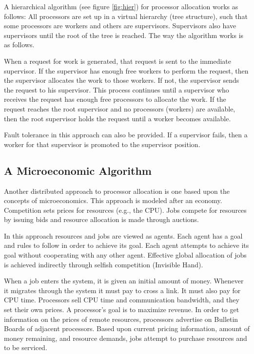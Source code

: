 \documentclass{report}
\begin{document}
A hierarchical algorithm (see figure \ref{fig:hier}) for processor
allocation works as follows: All processors are set up in a virtual
hierarchy (tree structure), such that some processors are workers and others
are supervisors.  Supervisors also have supervisors until the root of the
tree is reached.  The way the algorithm works is as follows.

When a request for work is generated, that request is sent to the immediate
supervisor.  If the supervisor has enough free workers to perform the
request, then the supervisor allocates the work to those workers.  If not,
the supervisor sends the request to his supervisor.  This process continues
until a supervisor who receives the request has enough free processors to
allocate the work.  If the request reaches the root supervisor and no
processors (workers) are available, then the root supervisor holds the
request until a worker becomes available.

Fault tolerance in this approach can also be provided.  If a supervisor
fails, then a worker for that supervisor is promoted to the supervisor
position.


\subsection{A Microeconomic Algorithm \cite{econ}}

Another distributed approach to processor allocation is one based upon the
concepts of microeconomics.  This approach is modeled after an economy.
Competition sets prices for resources (e.g., the CPU).  Jobs compete for
resources by issuing bids and resource allocation is made through auctions.

In this approach resources and jobs are viewed as agents.  Each agent has a
goal and rules to follow in order to achieve its goal.  Each agent attempts
to achieve its goal without cooperating with any other agent.  Effective
global allocation of jobs is achieved indirectly through selfish competition
(Invisible Hand).

When a job enters the system, it is given an initial amount of money.
Whenever it migrates through the system it must pay to cross a link.  It
must also pay for CPU time.  Processors sell CPU time and communication
bandwidth, and they set their own prices.  A processor's goal is to maximize
revenue.  In order to get information on the prices of remote resources,
processors advertise on Bulletin Boards of adjacent processors.  Based upon
current pricing information, amount of money remaining, and resource
demands, jobs attempt to purchase resources and to be serviced.
\end{document}
